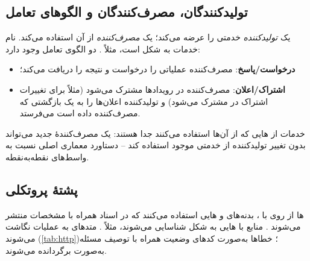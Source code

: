 \documentclass[11pt,a4paper]{article}
\begin{document}
\begin{acnfigure}
  \caption{سامانهٔ نسل پنجم با صفحهٔ کنترل سرویس‌محور () و نقاط مرجع به  و .}
  \label{fig:sba}
\end{acnfigure}

\subsection{تولیدکنندگان، مصرف‌کنندگان و الگوهای تعامل}
یک  \emph{تولیدکننده} خدمتی را عرضه می‌کند؛ یک  \emph{مصرف‌کننده} از آن استفاده می‌کند. نام خدمات به شکل
 است، مثلاً
. دو الگوی تعامل وجود دارد:
\begin{itemize}
  \item \textbf{درخواست/پاسخ}: مصرف‌کننده عملیاتی را درخواست و نتیجه را دریافت می‌کند؛
  \item \textbf{اشتراک/اعلان}: مصرف‌کننده در رویدادها مشترک می‌شود (مثلاً  برای تغییرات اشتراک در  مشترک
        می‌شود) و تولیدکننده اعلان‌ها را به یک  بازگشتی که مصرف‌کننده داده است می‌فرستد.
\end{itemize}
خدمات از هایی که از آن‌ها استفاده می‌کنند جدا هستند: یک مصرف‌کنندهٔ جدید می‌تواند بدون تغییر تولیدکننده از خدمتی
موجود استفاده کند -- دستاورد معماری اصلی نسبت به واسط‌های نقطه‌به‌نقطه.

\subsection{پشتهٔ پروتکلی}
ها از  \cite{rfc9113} روی  با ، بدنه‌های  و هایی استفاده می‌کنند که
در اسناد  همراه با مشخصات منتشر می‌شوند \cite{ts29500,ts29501}. منابع با هایی به شکل
 شناسایی می‌شوند، مثلاً
. متدهای  به عملیات نگاشت می‌شوند (\cref{tab:http})؛
خطاها به‌صورت کدهای وضعیت  همراه با توصیف مسئله به‌صورت  برگردانده می‌شوند.
\end{document}
